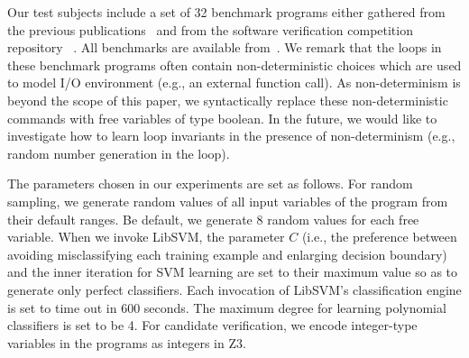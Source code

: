 Our test subjects include a set of 32 benchmark programs %
either gathered from the previous publications~\cite{gulwani2008program}\cite{sharma2012interpolants} and from
the software verification competition repository~\cite{beyer:SVCOMP:2013}\cite{Dirk:SVCOMP:2016}
.
All benchmarks are available from~\cite{zilu}.
We remark that the loops in these benchmark programs often contain non-deterministic choices
which are used to model I/O environment (e.g., an external function call).
As non-determinism is beyond the scope of this paper, we syntactically replace these non-deterministic commands with free variables of type boolean. In the future, we would like to investigate how to learn loop invariants in the presence of non-determinism (e.g., random number generation in the loop).

The parameters chosen in our experiments are set as follows. For random sampling, we generate random values of all input variables of the program from their default ranges. Be default, we generate 8 random values for each free variable.
When we invoke LibSVM, the parameter $C$ (i.e., the preference between avoiding misclassifying each training example and enlarging decision boundary) and the inner iteration for SVM learning are set to their maximum value so as to generate only perfect classifiers. 
Each invocation of LibSVM's classification engine is set to time out in 600 seconds. 
The maximum degree for learning polynomial classifiers is set to be 4. For candidate verification, we encode integer-type variables in the programs as integers in Z3.


